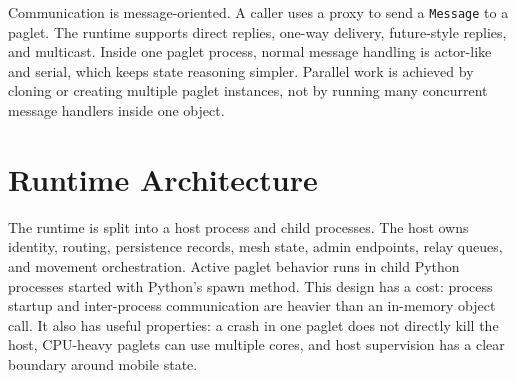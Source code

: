\documentclass[11pt,a4paper]{article}
\begin{document}
Communication is message-oriented. A caller uses a proxy to send a
\texttt{Message} to a paglet. The runtime supports direct replies, one-way
delivery, future-style replies, and multicast. Inside one paglet process, normal
message handling is actor-like and serial, which keeps state reasoning simpler.
Parallel work is achieved by cloning or creating multiple paglet instances, not
by running many concurrent message handlers inside one object.

\section{Runtime Architecture}

The runtime is split into a host process and child processes. The host owns
identity, routing, persistence records, mesh state, admin endpoints, relay
queues, and movement orchestration. Active paglet behavior runs in child Python
processes started with Python's spawn method. This design has a cost: process
startup and inter-process communication are heavier than an in-memory object
call. It also has useful properties: a crash in one paglet does not directly
kill the host, CPU-heavy paglets can use multiple cores, and host supervision
has a clear boundary around mobile state.
\end{document}
